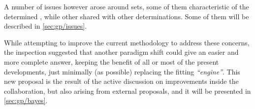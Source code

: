 A number of issues however arose around \nnpdf sets, some of them
characteristic of the \nn determined \pdfs, while other shared with other
determinations.
%
Some of them will be described in \cref{sec:gp/issues}.

While attempting to improve the current methodology to address these concerns,
the inspection suggested that another paradigm shift could give an easier and
more complete answer, keeping the benefit of all or most of the present
developments, just minimally (as possible) replacing the fitting
\textit{\enquote{engine}}.
%
This new proposal is the result of the active discussion on improvements inside
the collaboration, but also arising from external proposals, and it will be
presented in \cref{sec:gp/bayes}.
